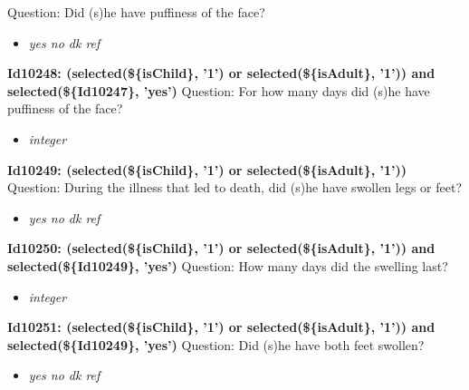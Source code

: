 \documentclass{article}%
\begin{document}
Question: Did (s)he have puffiness of the face?\newline%
%
\begin{itemize}%
\item%
\textit{yes\newline%
 no\newline%
 dk\newline%
 ref\newline%
}%
\end{itemize}%
\textbf{Id10248: (selected(\$\{isChild\}, '1') or selected(\$\{isAdult\}, '1')) and selected(\$\{Id10247\}, 'yes')\newline%
}%
Question: For how many days did (s)he have puffiness of the face?\newline%
%
\begin{itemize}%
\item%
\textit{integer\newline%
}%
\end{itemize}%
\textbf{Id10249: (selected(\$\{isChild\}, '1') or selected(\$\{isAdult\}, '1'))\newline%
}%
Question: During the illness that led to death, did (s)he have swollen legs or feet?\newline%
%
\begin{itemize}%
\item%
\textit{yes\newline%
 no\newline%
 dk\newline%
 ref\newline%
}%
\end{itemize}%
\textbf{Id10250: (selected(\$\{isChild\}, '1') or selected(\$\{isAdult\}, '1')) and selected(\$\{Id10249\}, 'yes')\newline%
}%
Question: How many days did the swelling last?\newline%
%
\begin{itemize}%
\item%
\textit{integer\newline%
}%
\end{itemize}%
\textbf{Id10251: (selected(\$\{isChild\}, '1') or selected(\$\{isAdult\}, '1')) and selected(\$\{Id10249\}, 'yes')\newline%
}%
Question: Did (s)he have both feet swollen?\newline%
%
\begin{itemize}%
\item%
\textit{yes\newline%
 no\newline%
 dk\newline%
 ref\newline%
}%
\end{itemize}%
\end{document}
